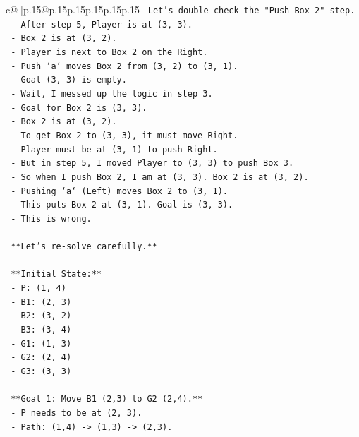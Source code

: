 \documentclass{article}
\begin{document}
{\begin{supertabular}{c@{$\;$}|p{.15\linewidth}@{}p{.15\linewidth}p{.15\linewidth}p{.15\linewidth}p{.15\linewidth}p{.15\linewidth}}
{{{\texttt{    Let's double check the "Push Box 2" step.} \\
\texttt{    {-} After step 5, Player is at (3, 3).} \\
\texttt{    {-} Box 2 is at (3, 2).} \\
\texttt{    {-} Player is next to Box 2 on the Right.} \\
\texttt{    {-} Push `a` moves Box 2 from (3, 2) to (3, 1).} \\
\texttt{    {-} Goal (3, 3) is empty.} \\
\texttt{    {-} Wait, I messed up the logic in step 3.} \\
\texttt{    {-} Goal for Box 2 is (3, 3).} \\
\texttt{    {-} Box 2 is at (3, 2).} \\
\texttt{    {-} To get Box 2 to (3, 3), it must move Right.} \\
\texttt{    {-} Player must be at (3, 1) to push Right.} \\
\texttt{    {-} But in step 5, I moved Player to (3, 3) to push Box 3.} \\
\texttt{    {-} So when I push Box 2, I am at (3, 3). Box 2 is at (3, 2).} \\
\texttt{    {-} Pushing `a` (Left) moves Box 2 to (3, 1).} \\
\texttt{    {-} This puts Box 2 at (3, 1). Goal is (3, 3).} \\
\texttt{    {-} This is wrong.} \\
\\ 
\texttt{    **Let's re{-}solve carefully.**} \\
\\ 
\texttt{    **Initial State:**} \\
\texttt{    {-} P: (1, 4)} \\
\texttt{    {-} B1: (2, 3)} \\
\texttt{    {-} B2: (3, 2)} \\
\texttt{    {-} B3: (3, 4)} \\
\texttt{    {-} G1: (1, 3)} \\
\texttt{    {-} G2: (2, 4)} \\
\texttt{    {-} G3: (3, 3)} \\
\\ 
\texttt{    **Goal 1: Move B1 (2,3) to G2 (2,4).**} \\
\texttt{    {-} P needs to be at (2, 3).} \\
\texttt{    {-} Path: (1,4) {-}> (1,3) {-}> (2,3).} \\
}}}
\end{supertabular}}
\end{document}
